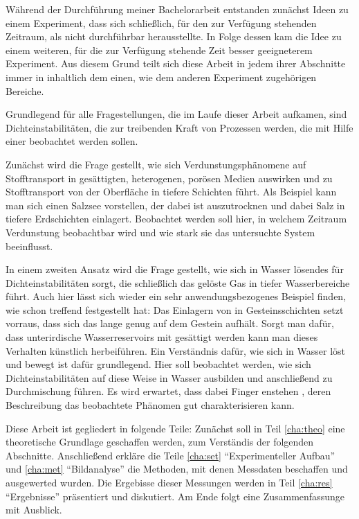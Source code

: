 
\label{cha:intro}

Während der Durchführung meiner Bachelorarbeit entstanden zunächst Ideen zu einem Experiment, dass sich schließlich, für den zur Verfügung stehenden Zeitraum, als nicht durchführbar herausstellte.
In Folge dessen kam die Idee zu einem weiteren, für die zur Verfügung stehende Zeit besser geeigneterem Experiment. Aus diesem Grund teilt sich diese Arbeit in jedem ihrer Abschnitte immer in inhaltlich dem einen, wie dem anderen Experiment zugehörigen Bereiche.

Grundlegend für alle Fragestellungen, die im Laufe dieser Arbeit aufkamen, sind Dichteinstabilitäten, die zur treibenden Kraft von Prozessen werden, die mit Hilfe einer \HSC beobachtet werden sollen.

Zunächst wird die Frage gestellt, wie sich Verdunstungsphänomene auf Stofftransport in gesättigten, heterogenen, porösen Medien auswirken und zu Stofftransport von der Oberfläche in tiefere Schichten führt. Als Beispiel kann man sich einen Salzsee vorstellen, der dabei ist auszutrocknen und dabei Salz in tiefere Erdschichten einlagert. Beobachtet werden soll hier, in welchem Zeitraum Verdunstung beobachtbar wird und wie stark sie das untersuchte System beeinflusst.

In einem zweiten Ansatz wird die Frage gestellt, wie sich in Wasser lösendes \COT für Dichteinstabilitäten sorgt, die schließlich das gelöste Gas in tiefer Wasserbereiche führt. Auch hier lässt sich wieder ein sehr anwendungsbezogenes Beispiel finden, wie schon \cite{fernandez} treffend festgestellt hat: Das Einlagern von \COT in Gesteinsschichten setzt vorraus, dass sich das \COT lange genug auf dem Gestein aufhält. Sorgt man dafür, dass unterirdische Wasserreservoirs mit \COT gesättigt werden kann man dieses Verhalten künstlich herbeiführen. Ein Verständnis dafür, wie sich \COT in Wasser löst und bewegt ist dafür grundlegend. Hier soll beobachtet werden, wie sich Dichteinstabilitäten auf diese Weise in Wasser ausbilden und anschließend zu Durchmischung führen. Es wird erwartet, dass dabei Finger enstehen , deren Beschreibung das beobachtete Phänomen gut charakterisieren kann.

Diese Arbeit ist gegliedert in folgende Teile: Zunächst soll in Teil \ref{cha:theo} eine theoretische Grundlage geschaffen werden, zum Verständis der folgenden Abschnitte. Anschließend erkläre die Teile \ref{cha:set} "`Experimenteller Aufbau"' und \ref{cha:met} "`Bildanalyse"' die Methoden, mit denen Messdaten beschaffen und ausgewerted wurden. Die Ergebisse dieser Messungen werden in Teil \ref{cha:res} "`Ergebnisse"' präsentiert und diskutiert. Am Ende folgt eine Zusammenfassunge mit Ausblick.